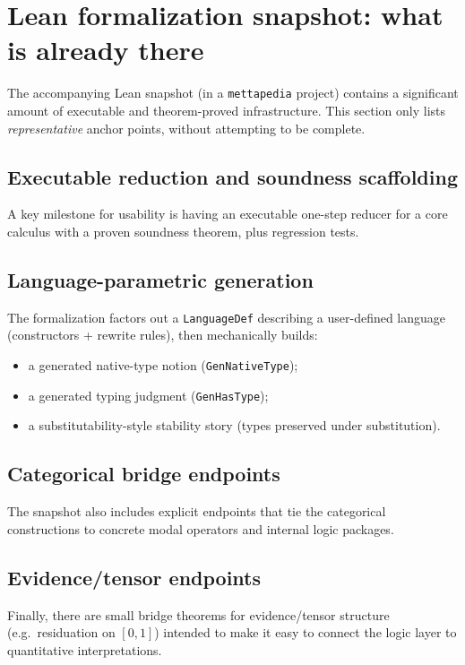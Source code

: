 \documentclass[11pt]{article}
\newcommand{\leanid}[1]{\texttt{#1}}
\begin{document}
\section{Lean formalization snapshot: what is already there}

The accompanying Lean snapshot (in a \texttt{mettapedia} project) contains a significant amount of
executable and theorem-proved infrastructure. This section only lists \emph{representative} anchor points,
without attempting to be complete.

\subsection{Executable reduction and soundness scaffolding}
A key milestone for usability is having an executable one-step reducer for a core calculus
with a proven soundness theorem, plus regression tests.

\subsection{Language-parametric generation}
The formalization factors out a \leanid{LanguageDef} describing a user-defined language
(constructors + rewrite rules), then mechanically builds:

\begin{itemize}
\item a generated native-type notion (\leanid{GenNativeType});
\item a generated typing judgment (\leanid{GenHasType});
\item a substitutability-style stability story (types preserved under substitution).
\end{itemize}

\subsection{Categorical bridge endpoints}
The snapshot also includes explicit endpoints that tie the categorical constructions to
concrete modal operators and internal logic packages.

\subsection{Evidence/tensor endpoints}
Finally, there are small bridge theorems for evidence/tensor structure (e.g.\ residuation on \([0,1]\))
intended to make it easy to connect the logic layer to quantitative interpretations.
\end{document}
